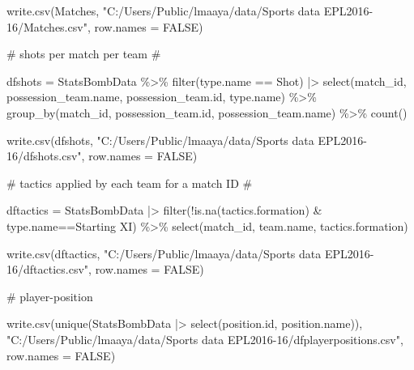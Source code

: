 \documentclass[
  letterpaper,
  DIV=11,
  numbers=noendperiod]{scrartcl}
\newenvironment{Shaded}{\begin{snugshade}}{\end{snugshade}}
\newcommand{\AttributeTok}[1]{\textcolor[rgb]{0.40,0.45,0.13}{#1}}
\newcommand{\CommentTok}[1]{\textcolor[rgb]{0.37,0.37,0.37}{#1}}
\newcommand{\ConstantTok}[1]{\textcolor[rgb]{0.56,0.35,0.01}{#1}}
\newcommand{\FunctionTok}[1]{\textcolor[rgb]{0.28,0.35,0.67}{#1}}
\newcommand{\InformationTok}[1]{\textcolor[rgb]{0.37,0.37,0.37}{#1}}
\newcommand{\NormalTok}[1]{\textcolor[rgb]{0.00,0.23,0.31}{#1}}
\newcommand{\OtherTok}[1]{\textcolor[rgb]{0.00,0.23,0.31}{#1}}
\newcommand{\SpecialCharTok}[1]{\textcolor[rgb]{0.37,0.37,0.37}{#1}}
\newcommand{\StringTok}[1]{\textcolor[rgb]{0.13,0.47,0.30}{#1}}
\begin{document}
\begin{Shaded}
\begin{Highlighting}[]
\FunctionTok{write.csv}\NormalTok{(Matches, }\StringTok{"C:/Users/Public/lmaaya/data/Sports data EPL2016{-}16/Matches.csv"}\NormalTok{, }
\AttributeTok{row.names =} \ConstantTok{FALSE}\NormalTok{)}

\CommentTok{\# shots per match per team}
\CommentTok{\# }

\NormalTok{dfshots }\OtherTok{=}\NormalTok{ StatsBombData }\SpecialCharTok{\%\textgreater{}\%} \FunctionTok{filter}\NormalTok{(type.name }\SpecialCharTok{==} \StringTok{\textquotesingle{}Shot\textquotesingle{}}\NormalTok{) }\SpecialCharTok{|\textgreater{}} 
  \FunctionTok{select}\NormalTok{(match\_id, possession\_team.name, possession\_team.id, type.name) }\SpecialCharTok{\%\textgreater{}\%} 
  \FunctionTok{group\_by}\NormalTok{(match\_id, possession\_team.id, possession\_team.name) }\SpecialCharTok{\%\textgreater{}\%} \FunctionTok{count}\NormalTok{()}
  
\FunctionTok{write.csv}\NormalTok{(dfshots, }\StringTok{"C:/Users/Public/lmaaya/data/Sports data EPL2016{-}16/dfshots.csv"}\NormalTok{, }
\AttributeTok{row.names =} \ConstantTok{FALSE}\NormalTok{)}

\CommentTok{\# tactics applied by each team for a match ID}
\CommentTok{\#   }

\NormalTok{dftactics }\OtherTok{=}\NormalTok{ StatsBombData }\SpecialCharTok{|\textgreater{}} \FunctionTok{filter}\NormalTok{(}\SpecialCharTok{!}\FunctionTok{is.na}\NormalTok{(tactics.formation) }\SpecialCharTok{\&}\NormalTok{ type.name}\SpecialCharTok{==}\StringTok{\textquotesingle{}Starting XI\textquotesingle{}}\NormalTok{) }\SpecialCharTok{\%\textgreater{}\%} 
  \FunctionTok{select}\NormalTok{(match\_id, team.name, tactics.formation)}

\FunctionTok{write.csv}\NormalTok{(dftactics, }\StringTok{"C:/Users/Public/lmaaya/data/Sports data EPL2016{-}16/dftactics.csv"}\NormalTok{, }
\AttributeTok{row.names =} \ConstantTok{FALSE}\NormalTok{)}

\CommentTok{\# player{-}position}

\FunctionTok{write.csv}\NormalTok{(}\FunctionTok{unique}\NormalTok{(StatsBombData }\SpecialCharTok{|\textgreater{}} \FunctionTok{select}\NormalTok{(position.id, position.name)), }
          \StringTok{"C:/Users/Public/lmaaya/data/Sports data EPL2016{-}16/dfplayerpositions.csv"}\NormalTok{,}
          \AttributeTok{row.names =} \ConstantTok{FALSE}\NormalTok{)}
                                                                                                                           
\InformationTok{\textasciigrave{}\textasciigrave{}\textasciigrave{}}
\end{Highlighting}
\end{Shaded}
\end{document}
